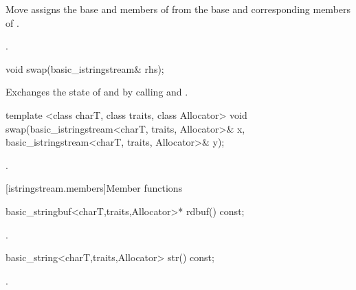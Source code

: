 \begin{itemdescr}
\pnum
\effects Move assigns the base and members of  from the base and corresponding
members of .

\pnum
\returns {}.
\end{itemdescr}

%
%
\begin{itemdecl}
void swap(basic_istringstream& rhs);
\end{itemdecl}

\begin{itemdescr}
\pnum
\effects Exchanges the state of  and
 by calling
 and
.
\end{itemdescr}


%
%
\begin{itemdecl}
template <class charT, class traits, class Allocator>
void swap(basic_istringstream<charT, traits, Allocator>& x,
          basic_istringstream<charT, traits, Allocator>& y);
\end{itemdecl}

\begin{itemdescr}
\pnum
\effects {}.
\end{itemdescr}

[istringstream.members]{Member functions}

%
\begin{itemdecl}
basic_stringbuf<charT,traits,Allocator>* rdbuf() const;
\end{itemdecl}

\begin{itemdescr}
\pnum
\returns
{}.
\end{itemdescr}

%
\begin{itemdecl}
basic_string<charT,traits,Allocator> str() const;
\end{itemdecl}

\begin{itemdescr}
\pnum
\returns
{}.
\end{itemdescr}

